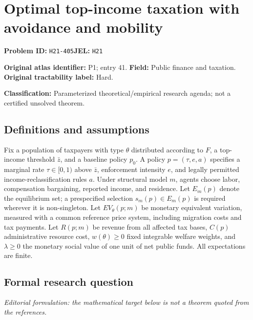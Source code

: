 \documentclass[11pt,a4paper]{article}
\begin{document}
\section*{Optimal top-income taxation with avoidance and mobility}
\textbf{Problem ID:} \texttt{H21-405}\quad \textbf{JEL:} \texttt{H21}\par
\label{problem:OP-0041}
\label{atlas:prob:P1}
\noindent\textbf{Original atlas identifier:} P1; entry 41. \textbf{Field:} Public finance and taxation. \textbf{Original tractability label:} Hard.

\noindent\textbf{Classification:} Parameterized theoretical/empirical research agenda; not a certified unsolved theorem.

\subsection*{Definitions and assumptions}
Fix a population of taxpayers with type $\theta$ distributed according to $F$, a top-income threshold $\bar z$, and a baseline policy $p_0$. A policy $p=(\tau,e,a)$ specifies a marginal rate $\tau\in[0,1)$ above $\bar z$, enforcement intensity $e$, and legally permitted income-reclassification rules $a$. Under structural model $m$, agents choose labor, compensation bargaining, reported income, and residence. Let $E_m(p)$ denote the equilibrium set; a prespecified selection $s_m(p)\in E_m(p)$ is required wherever it is non-singleton. Let $EV_\theta(p;m)$ be monetary equivalent variation, measured with a common reference price system, including migration costs and tax payments. Let $R(p;m)$ be revenue from all affected tax bases, $C(p)$ administrative resource cost, $w(\theta)\geq0$ fixed integrable welfare weights, and $\lambda\geq0$ the monetary social value of one unit of net public funds. All expectations are finite.

\subsection*{Formal research question}
\emph{Editorial formulation: the mathematical target below is not a theorem quoted from the references.}
\end{document}
